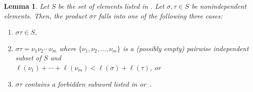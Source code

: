 \documentclass{amsart}
\newtheorem{lemma}[theorem]{Lemma}
\theoremstyle{definition}
\begin{document}
\begin{lemma}\label{lem:ProductOfTwoBASs}
    Let $S$ be the set of elements listed in .
    Let $\sigma, \tau\in S$ be nonindependent elements.
    Then, the product $\sigma\tau$ falls into one of the following three cases:
    \begin{enumerate}
        \item $\sigma\tau\in S$,
        \item $\sigma\tau=\nu_1\nu_2\cdots\nu_m$ where $\{\nu_1,\nu_2,\ldots,\nu_m\}$ is a (possibly empty) pairwise independent subset of $S$ and \\
        $\ell(\nu_1)+\cdots+\ell(\nu_m)<\ell(\sigma)+\ell(\tau)$, or
        \item $\sigma\tau$ contains a forbidden subword listed in  or~.
    \end{enumerate}
\end{lemma}
\end{document}
